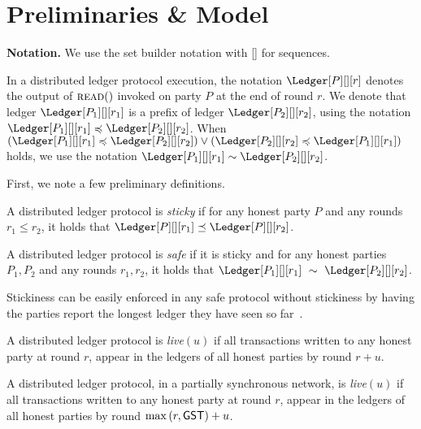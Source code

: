 \section{Preliminaries \& Model}

\textbf{Notation.}
We use the set builder notation with [] for sequences.

In a distributed ledger protocol execution, the notation
$\Ledger[P][][r]$ denotes the output of $\textsc{read}()$
invoked on party $P$ at the end of round $r$. 
We denote that ledger
$\Ledger[P_1][][r_1]$ is a prefix of ledger $\Ledger[P_2][][r_2]$,
using the notation
$\Ledger[P_1][][r_1] \preccurlyeq \Ledger[P_2][][r_2]$. When
$(\Ledger[P_1][][r_1] \preccurlyeq \Ledger[P_2][][r_2]) \lor (\Ledger[P_2][][r_2] \preccurlyeq \Ledger[P_1][][r_1])$ holds,
we use the notation $\Ledger[P_1][][r_1] \sim \Ledger[P_2][][r_2]$.



First, we note a few preliminary definitions.




\begin{definition}[Stickiness]
  A distributed ledger protocol is \emph{sticky} if
  for any honest party $P$ and any rounds $r_1 \leq r_2$,
  it holds that $\Ledger[P][][r_1] \preceq \Ledger[P][][r_2]$.
\end{definition}

\begin{definition}[Safety]
  A distributed ledger protocol is \emph{safe} if it is sticky and
  for any honest parties $P_1, P_2$ and any rounds $r_1, r_2$, it holds that
  $\Ledger[P_1][][r_1]~\sim~\Ledger[P_2][][r_2]$. 
\end{definition}

Stickiness can be easily enforced in any safe protocol
without stickiness by having the parties report the longest
ledger they have seen so far~\cite{streamlet}.

\begin{definition}[Liveness]
  A distributed ledger protocol is \emph{live}$(u)$ if
  all transactions written to any honest party
  at round $r$, appear in the ledgers of all honest parties by round
  $r + u$.
\end{definition}

\begin{definition}
  A distributed ledger protocol, in a partially synchronous network,
  is \emph{live}$(u)$ if all transactions written to any honest party
  at round $r$, appear in the ledgers of all honest parties by round
  $\max{(r,\textsf{GST})} + u$.
\end{definition}

